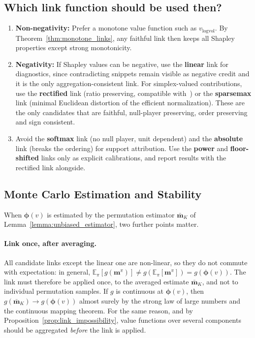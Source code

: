 \documentclass{article}
\begin{document}
\subsection{Which link function should be used then?}
\begin{enumerate}
    \item{\bf Non-negativity:}  Prefer a monotone value function such as $v_{\text{logvol}}$. By Theorem~\ref{thm:monotone_links}, any faithful link then keeps all Shapley properties except strong monotonicity.
    \item{\bf Negativity:} If Shapley values can be negative, use the \textbf{linear} link for diagnostics, since contradicting snippets remain visible as negative credit and it is the only aggregation-consistent link. For simplex-valued contributions, use the \textbf{rectified} link (ratio preserving, compatible with~\cite{nematov2025source}) or the \textbf{sparsemax} link (minimal Euclidean distortion of the efficient normalization). These are the only candidates that are faithful, null-player preserving, order preserving and sign consistent.
    \item Avoid the \textbf{softmax} link (no null player, unit dependent) and the \textbf{absolute} link (breaks the ordering) for support attribution. Use the \textbf{power} and \textbf{floor-shifted} links only as explicit calibrations, and report results with the rectified link alongside.
\end{enumerate}

\subsection{Monte Carlo Estimation and Stability}
\label{subsec:link_stability}

When $\boldsymbol{\phi}(v)$ is estimated by the permutation estimator $\bar{\mathbf{m}}_K$ of Lemma~\ref{lemma:unbiased_estimator}, two further points matter.

\paragraph{Link once, after averaging.}
All candidate links except the linear one are non-linear, so they do not commute with expectation: in general, $\mathbb{E}_\pi[g(\mathbf{m}^\pi)] \neq g(\mathbb{E}_\pi[\mathbf{m}^\pi]) = g(\boldsymbol{\phi}(v))$. The link must therefore be applied once, to the averaged estimate $\bar{\mathbf{m}}_K$, and not to individual permutation samples. If $g$ is continuous at $\boldsymbol{\phi}(v)$, then $g(\bar{\mathbf{m}}_K) \to g(\boldsymbol{\phi}(v))$ almost surely by the strong law of large numbers and the continuous mapping theorem. For the same reason, and by Proposition~\ref{prop:link_impossibility}, value functions over several components should be aggregated \emph{before} the link is applied.
\end{document}

